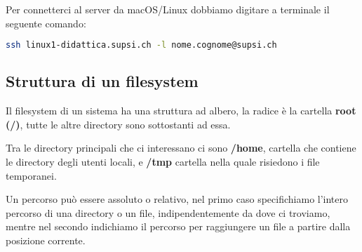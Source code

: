\documentclass[../main.tex]{subfiles}
\begin{document}
Per connetterci al server da macOS/Linux dobbiamo digitare a terminale il seguente comando:
\begin{lstlisting}[language=bash]
ssh linux1-didattica.supsi.ch -l nome.cognome@supsi.ch
\end{lstlisting}

\subsection{Struttura di un filesystem}
Il filesystem di un sistema ha una struttura ad albero, la radice è la cartella \textbf{root (/)}, tutte le altre directory sono sottostanti ad essa.

Tra le directory principali che ci interessano ci sono \textbf{/home}, cartella che contiene le directory degli utenti locali, e \textbf{/tmp} cartella nella quale risiedono i file temporanei.

Un percorso può essere assoluto o relativo, nel primo caso specifichiamo l'intero percorso di una directory o un file, indipendentemente da dove ci troviamo, mentre nel secondo indichiamo il percorso per raggiungere un file a partire dalla posizione corrente.
\end{document}
